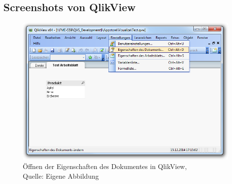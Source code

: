 \begin{appendix} 

\renewcommand\section{\stdsection}

\newpage

\section*{Anhang} 
\renewcommand{\thesubsection}{\Alph{subsection}}

\subsection{Screenshots von QlikView} 
\label{lab:ScreenshotsVonQlikView}

\ifIncludeFigures\begin{figure}[htbp]
	\centering
		\includegraphics[width=1.00\textwidth]{img/DocumentExtensionListe/EigenschaftendesDokumentes.png}
	\caption[Öffnen der Eigenschaften des Dokumentes in QlikView]{Öffnen der Eigenschaften des Dokumentes in QlikView, \\Quelle: Eigene Abbildung}
	\label{fig:EigenschaftendesDokumentes}
\end{figure}\fi



\end{appendix}
